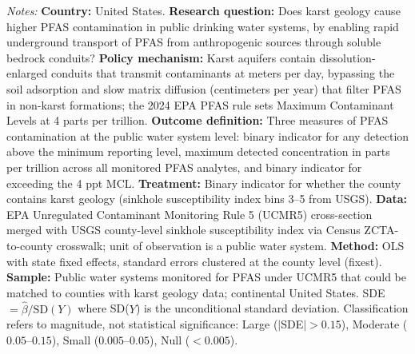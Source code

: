 \begin{table}[htbp]
\begin{threeparttable}
\begin{tablenotes}[flushleft]
\item \textit{Notes:} \textbf{Country:} United States. \textbf{Research question:} Does karst geology cause higher PFAS contamination in public drinking water systems, by enabling rapid underground transport of PFAS from anthropogenic sources through soluble bedrock conduits? \textbf{Policy mechanism:} Karst aquifers contain dissolution-enlarged conduits that transmit contaminants at meters per day, bypassing the soil adsorption and slow matrix diffusion (centimeters per year) that filter PFAS in non-karst formations; the 2024 EPA PFAS rule sets Maximum Contaminant Levels at 4 parts per trillion. \textbf{Outcome definition:} Three measures of PFAS contamination at the public water system level: binary indicator for any detection above the minimum reporting level, maximum detected concentration in parts per trillion across all monitored PFAS analytes, and binary indicator for exceeding the 4 ppt MCL. \textbf{Treatment:} Binary indicator for whether the county contains karst geology (sinkhole susceptibility index bins 3--5 from USGS). \textbf{Data:} EPA Unregulated Contaminant Monitoring Rule 5 (UCMR5) cross-section merged with USGS county-level sinkhole susceptibility index via Census ZCTA-to-county crosswalk; unit of observation is a public water system. \textbf{Method:} OLS with state fixed effects, standard errors clustered at the county level (fixest). \textbf{Sample:} Public water systems monitored for PFAS under UCMR5 that could be matched to counties with karst geology data; continental United States. SDE $= \hat{\beta} / \text{SD}(Y)$ where SD($Y$) is the unconditional standard deviation. Classification refers to magnitude, not statistical significance: Large ($|$SDE$| > 0.15$), Moderate ($0.05$--$0.15$), Small ($0.005$--$0.05$), Null ($< 0.005$).
\end{tablenotes}
\end{threeparttable}
\end{table}
